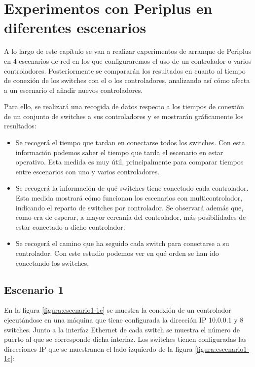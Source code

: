 \documentclass[a4paper, 12pt]{book}
\begin{document}
	\clearpage
	\chapter{Experimentos con Periplus en diferentes escenarios}
	\label{chap:experimentos}
	
 	A lo largo de este capítulo se van a realizar experimentos de arranque de Periplus en 4 escenarios de red en los que configuraremos el uso de un controlador o varios controladores. Posteriormente se compararán los resultados en cuanto al tiempo de conexión de los switches con el o los controladores, analizando así cómo afecta a un escenario el añadir nuevos controladores.%
	 
	Para ello, se realizará una recogida de datos respecto a los tiempos de conexión de un conjunto de switches a sus controladores y se mostrarán gráficamente los resultados: 
	
	
	\begin{itemize}
		\item Se recogerá el tiempo que tardan en conectarse todos los switches. Con esta información podemos saber el tiempo que tarda el escenario en estar operativo. Esta medida es muy útil, principalmente para comparar tiempos entre escenarios con uno y varios controladores.
		
		\item Se recogerá la información de qué switches tiene conectado cada controlador. Esta medida mostrará cómo funcionan los escenarios con multicontrolador, indicando el reparto de switches por controlador. Se observará además que, como era de esperar, a mayor cercanía del controlador, más posibilidades de estar conectado a dicho controlador.
		
		\item Se recogerá el camino que ha seguido cada switch para conectarse a su controlador. Con este estudio podemos ver en qué orden se han ido conectando los switches.
		
	\end{itemize}
 	
 	\clearpage
 	\section{Escenario 1}
 	
 	En la figura \ref{figura:escenario1-1c} se muestra la conexión de un controlador
	ejecutándose en una máquina que tiene configurada la dirección
 	IP 10.0.0.1 y 8 switches. Junto a la interfaz Ethernet de cada switch
 	se muestra el número de puerto al que se corresponde dicha interfaz.
 	Los switches tienen configuradas las direcciones IP que se muestranen el lado izquierdo de la figura \ref{figura:escenario1-1c}:
 	
\end{document}
